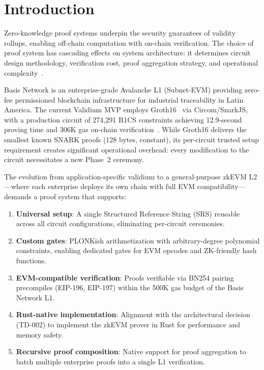 
\section{Introduction}
\label{sec:introduction}

Zero-knowledge proof systems underpin the security guarantees of
validity rollups, enabling off-chain computation with on-chain
verification. The choice of proof system has cascading effects on
system architecture: it determines circuit design methodology,
verification cost, proof aggregation strategy, and operational
complexity~\cite{plonk,groth16}.

Basis Network is an enterprise-grade Avalanche L1 (Subnet-EVM)
providing zero-fee permissioned blockchain infrastructure for
industrial traceability in Latin America. The current Validium MVP
employs Groth16~\cite{groth16} via Circom/SnarkJS, with a production
circuit of 274,291 R1CS constraints achieving 12.9-second proving
time and 306K gas on-chain verification~\cite{basis-validium}. While
Groth16 delivers the smallest known SNARK proofs (128 bytes, constant),
its per-circuit trusted setup requirement creates significant
operational overhead: every modification to the circuit necessitates
a new Phase~2 ceremony.

The evolution from application-specific validium to a general-purpose
zkEVM L2---where each enterprise deploys its own chain with full EVM
compatibility---demands a proof system that supports:

\begin{enumerate}
  \item \textbf{Universal setup}: A single Structured Reference String
    (SRS) reusable across all circuit configurations, eliminating
    per-circuit ceremonies.
  \item \textbf{Custom gates}: PLONKish arithmetization with
    arbitrary-degree polynomial constraints, enabling dedicated gates
    for EVM opcodes and ZK-friendly hash functions.
  \item \textbf{EVM-compatible verification}: Proofs verifiable via
    BN254 pairing precompiles (EIP-196, EIP-197) within the 500K gas
    budget of the Basis Network L1.
  \item \textbf{Rust-native implementation}: Alignment with the
    architectural decision (TD-002) to implement the zkEVM prover
    in Rust for performance and memory safety.
  \item \textbf{Recursive proof composition}: Native support for
    proof aggregation to batch multiple enterprise proofs into a
    single L1 verification.
\end{enumerate}

